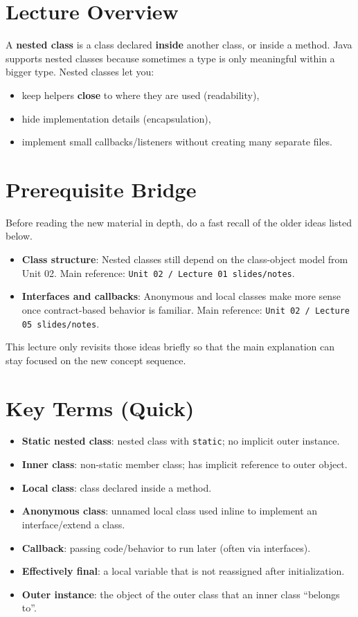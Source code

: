 \documentclass[11pt]{article}
\begin{document}
\section{Lecture Overview}
A \textbf{nested class} is a class declared \textbf{inside} another class, or inside a method.
Java supports nested classes because sometimes a type is only meaningful within a bigger type.
Nested classes let you:
\begin{itemize}
  \item keep helpers \textbf{close} to where they are used (readability),
  \item hide implementation details (encapsulation),
  \item implement small callbacks/listeners without creating many separate files.
\end{itemize}
\notesources{\OOPSUnitIIISources}

\section{Prerequisite Bridge}
Before reading the new material in depth, do a fast recall of the older ideas listed below.
\begin{itemize}
  \item \textbf{Class structure}: Nested classes still depend on the class-object model from Unit 02. Main reference: \texttt{Unit 02 / Lecture 01 slides/notes}.
  \item \textbf{Interfaces and callbacks}: Anonymous and local classes make more sense once contract-based behavior is familiar. Main reference: \texttt{Unit 02 / Lecture 05 slides/notes}.
\end{itemize}
This lecture only revisits those ideas briefly so that the main explanation can stay focused on the new concept sequence.
\notesources{\OOPSUnitIIISources}

\section{Key Terms (Quick)}
\begin{itemize}
  \item \textbf{Static nested class}: nested class with \texttt{static}; no implicit outer instance.
  \item \textbf{Inner class}: non-static member class; has implicit reference to outer object.
  \item \textbf{Local class}: class declared inside a method.
  \item \textbf{Anonymous class}: unnamed local class used inline to implement an interface/extend a class.
  \item \textbf{Callback}: passing code/behavior to run later (often via interfaces).
  \item \textbf{Effectively final}: a local variable that is not reassigned after initialization.
  \item \textbf{Outer instance}: the object of the outer class that an inner class ``belongs to''.
\end{itemize}
\end{document}
